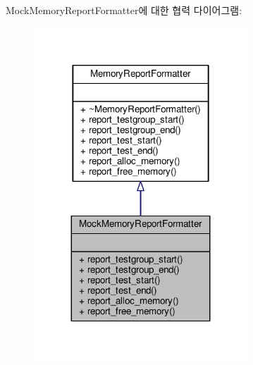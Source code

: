 Mock\+Memory\+Report\+Formatter에 대한 협력 다이어그램\+:
\nopagebreak
\begin{figure}[H]
\begin{center}
\leavevmode
\includegraphics[width=227pt]{class_mock_memory_report_formatter__coll__graph}
\end{center}
\end{figure}
